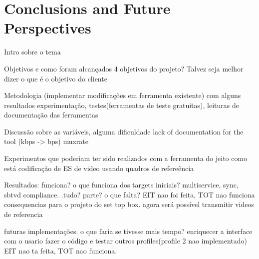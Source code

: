 \documentclass[
	12pt,				%
	openright,			%
	twoside,			%
	a4paper,			%
	brazil,
	french,				%
	english
	]{abntex2}
\begin{document}
\chapter*[Conclusions and Future Perspectives]{Conclusions and Future Perspectives}

Intro sobre o tema

Objetivos e como foram alcançados
	4 objetivos do projeto? Talvez seja melhor dizer o que é o objetivo do cliente
	
Metodologia (implementar modificações em ferramenta existente) com alguns resultados
	experimentação, testes(ferramentas de teste gratuitas), leituras de documentação das ferramentas

Discussão sobre as variáveis, alguma dificuldade 
	lack of documentation for the tool (kbps -> bps) muxrate

Experimentos que poderiam ter sido realizados com a ferramenta do jeito como está	
	codificação de ES de video usando quadros de refereência
	
Resultados: funciona? o que funciona dos targets iniciais? multiservice, sync, sbtvd compliance. .tudo? parte? o que falta?
	EIT nao foi feita, TOT nao funciona
	consequencias para o projeto do set top box. agora será possível transmitir videos de referencia
	
futuras implementações. o que faria se tivesse mais tempo?
	enriquecer a interface com o usario
	fazer o código e testar outros profiles(profile 2 nao implementado)
	EIT nao ta feita, TOT nao funciona.



\postextual



%
%

\end{document}
